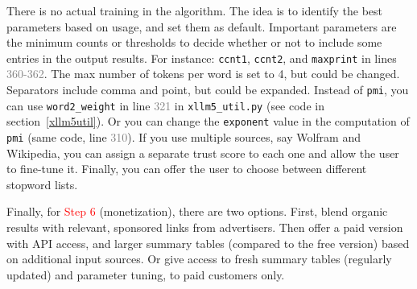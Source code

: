 \documentclass[oneside,10pt]{book}
\begin{document}
There is no actual training in the algorithm. The idea is to identify the best parameters based on usage, and set them as default. Important parameters are 
 the minimum counts or thresholds to decide whether or not to include some entries in the output results. For instance: \texttt{ccnt1}, \texttt{ccnt2}, and 
\texttt{maxprint}
 in lines \textcolor{gray}{360-362}. The max number of tokens per word is set to 4, but could be changed. Separators include comma and point, but could be expanded. 
Instead of \texttt{pmi}, you can use \texttt{word2\_weight} in line  \textcolor{gray}{321} in \texttt{xllm5\_util.py} (see code in section~\ref{xllm5util}). Or you can
 change the \texttt{exponent} value in the computation of \texttt{pmi} (same code, line \textcolor{gray}{310}). If you use multiple sources, say Wolfram and Wikipedia, you
 can assign a separate trust score to each one and allow the user to fine-tune it. Finally, you can offer the user to choose between different stopword lists.

Finally, for \textcolor{red}{Step 6} (monetization), there are two options. First, blend organic results with relevant, sponsored links from advertisers.  Then offer a paid version with API access, and larger summary tables (compared to the free version) based on additional input sources.  Or give access to fresh summary tables (regularly updated) and parameter tuning, to
 paid customers only.
\end{document}
